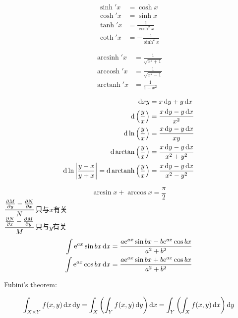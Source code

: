 \documentclass{article}
\DeclareMathOperator{\arccosh}{arccosh}
\DeclareMathOperator{\arcsinh}{arcsinh}
\DeclareMathOperator{\arctanh}{arctanh}
\begin{document}
\begin{align*}
    \sinh' x & = \cosh x                \\
    \cosh' x & = \sinh x                \\
    \tanh' x & = \frac{1}{\cosh^{2}x}   \\
    \coth' x & =- \frac{1}{\sinh^{2} x}
\end{align*}

\begin{align*}
    \arcsinh' x & =\frac{1}{\sqrt{x^{2}+1}} \\
    \arccosh' x & =\frac{1}{\sqrt{x^{2}-1}} \\
    \arctanh' x & =\frac{1}{1-x^{2}}
\end{align*}

\begin{align*}
    \d{xy}
    & =x\d{y}+y\d{x}                     \\
    \d{\left( \frac{y}{x} \right)}
    & =\frac{x\d{y}-y\d{x}}{x^{2}}       \\
    \d{\ln \left( \frac{y}{x} \right)}
    & =\frac{x\d{y}-y\d{x}}{xy}          \\
    \d{\arctan \left( \frac{y}{x} \right)}
    & =\frac{x\d{y}-y\d{x}}{x^{2}+y^{2}} \\
    \d{\ln \left| \frac{y - x}{y + x} \right|=\mathrm{d}
    \arctanh \left( \frac{y}{x} \right)} &
    =\frac{x\d{y}-y\d{x}}{x^{2}-y^{2}} \\
\end{align*}

\[\arcsin x +\arccos x =\frac{\pi}{2} \]
\(\dfrac{\pdv{M}{y} - \pdv{N}{x}}{N}\)只与\(x\)有关 \\
\(\dfrac{\pdv{N}{x} - \pdv{M}{y}}{M}\)只与\(y\)有关 \\

\begin{align*}
    \int \e^{ax} \sin bx \d{x} & =\frac{a\e^{ax} \sin bx -
    b\e^{ax}\cos bx}{a^{2}+b^{2}} \\
    \int \e^{ax} \cos bx \d{x} & =\frac{a\e^{ax} \sin bx +
    b\e^{ax}\cos bx}{a^{2}+b^{2}} \\
\end{align*}

Fubini's theorem:

\[
    \int_{X\times Y}  f(x, y) \d{x}\d{y} = \int_{X} \left(
        \int_{Y} f(x, y) \d{y} \right) \d{x} = \int_{Y} \left(
    \int_{X} f(x, y) \d{x} \right) \d{y}
\]

\end{document}
